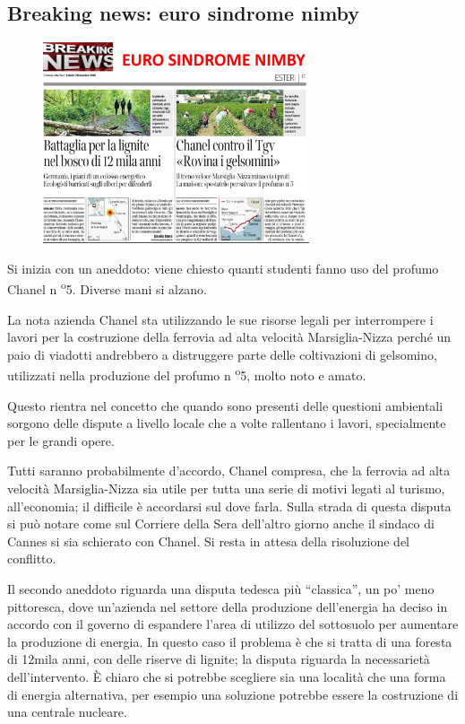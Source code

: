 
\subsection{Breaking news: euro sindrome nimby}

\begin{figure}[!ht]
\centering
	\includegraphics[width=0.7\textwidth]{23/image2.jpg}
	\end{figure}



Si inizia con un aneddoto: viene chiesto quanti studenti fanno uso del
profumo Chanel n \textsuperscript{o}5. Diverse mani si alzano.

La nota azienda Chanel sta utilizzando le sue risorse legali per
interrompere i lavori per la costruzione della ferrovia ad alta velocità
Marsiglia-Nizza perché un paio di viadotti andrebbero a distruggere
parte delle coltivazioni di gelsomino, utilizzati nella produzione del
profumo n \textsuperscript{o}5, molto noto e amato.

Questo rientra nel concetto che quando sono presenti delle questioni
ambientali sorgono delle dispute a livello locale che a volte rallentano
i lavori, specialmente per le grandi opere.

Tutti saranno probabilmente d'accordo, Chanel compresa, che la ferrovia
ad alta velocità Marsiglia-Nizza sia utile per tutta una serie di motivi
legati al turismo, all'economia; il difficile è accordarsi sul dove
farla. Sulla strada di questa disputa si può notare come sul Corriere
della Sera dell'altro giorno anche il sindaco di Cannes si sia schierato
con Chanel. Si resta in attesa della risoluzione del conflitto.

Il secondo aneddoto riguarda una disputa tedesca più ``classica'', un
po' meno pittoresca, dove un'azienda nel settore della produzione
dell'energia ha deciso in accordo con il governo di espandere l'area di
utilizzo del sottosuolo per aumentare la produzione di energia. In
questo caso il problema è che si tratta di una foresta di 12mila anni,
con delle riserve di lignite; la disputa riguarda la necessarietà
dell'intervento. È chiaro che si potrebbe scegliere sia una località che
una forma di energia alternativa, per esempio una soluzione potrebbe
essere la costruzione di una centrale nucleare.

